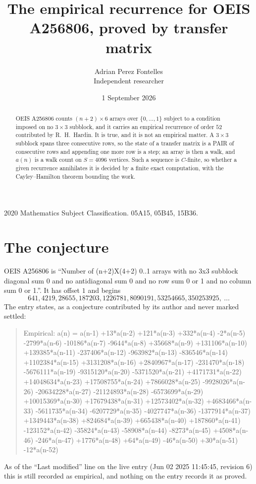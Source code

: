 \documentclass[11pt,a4paper]{article}
\title{The empirical recurrence for OEIS A256806, proved by transfer matrix}
\author{Adrian Perez Fontelles\\ \small Independent researcher}
\date{1 September 2026}
\theoremstyle{plain}
\theoremstyle{definition}
\begin{document}
\maketitle

\begin{abstract}
OEIS A256806 counts $(n+2)\times6$ arrays over $\{0,\dots,1\}$ subject to a condition imposed on
no $3\times3$ subblock, and it carries an empirical recurrence of order $52$
contributed by R.~H.~Hardin. It is true, and it is not an empirical matter. A $3\times3$
subblock spans three consecutive rows, so the state of a transfer matrix is a PAIR of
consecutive rows and appending one more row is a step; an array is then a walk, and
$a(n)$ is a walk count on $S=4096$ vertices. Such a sequence is $C$-finite, so whether a given
recurrence annihilates it is decided by a finite exact computation, with the Cayley--Hamilton
theorem bounding the work.
\end{abstract}

\noindent\small 2020 Mathematics Subject Classification. 05A15, 05B45, 15B36.\normalsize

\section{The conjecture}

OEIS A256806 is ``Number of (n+2)X(4+2) 0..1 arrays with no 3x3 subblock diagonal sum 0 and no antidiagonal sum 0 and no row sum 0 or 1 and no column sum 0 or 1.''. It has offset $1$ and begins
\[
641, 4219, 28655, 187203, 1226781, 8090191, 53254665, 350253925,\ \dots
\]
The entry states, as a conjecture contributed by its author and never marked settled:
\begin{quote}
Empirical: a(n) = a(n-1) +13*a(n-2) +121*a(n-3) +332*a(n-4) -2*a(n-5) -2799*a(n-6) -10186*a(n-7) -9644*a(n-8) +35668*a(n-9) +131106*a(n-10) +139385*a(n-11) -237406*a(n-12) -963982*a(n-13) -836546*a(n-14) +1102384*a(n-15) +3131208*a(n-16) +2840967*a(n-17) -231470*a(n-18) -5676111*a(n-19) -9315120*a(n-20) -5371520*a(n-21) +4171731*a(n-22) +14048634*a(n-23) +17508755*a(n-24) +7866028*a(n-25) -9928026*a(n-26) -20634228*a(n-27) -21124893*a(n-28) -6573699*a(n-29) +10015369*a(n-30) +17679438*a(n-31) +12573402*a(n-32) +4683466*a(n-33) -5611735*a(n-34) -6207729*a(n-35) -4027747*a(n-36) -1377914*a(n-37) +1349443*a(n-38) +824684*a(n-39) +665438*a(n-40) +187860*a(n-41) -123152*a(n-42) -35824*a(n-43) -58908*a(n-44) -8273*a(n-45) +4508*a(n-46) -246*a(n-47) +1776*a(n-48) +64*a(n-49) -46*a(n-50) +30*a(n-51) -12*a(n-52)
\end{quote}
As of the ``Last modified'' line on the live entry (Jun 02 2025 11:45:45, revision 6) this is still
recorded as empirical, and nothing on the entry records it as proved.
\end{document}
